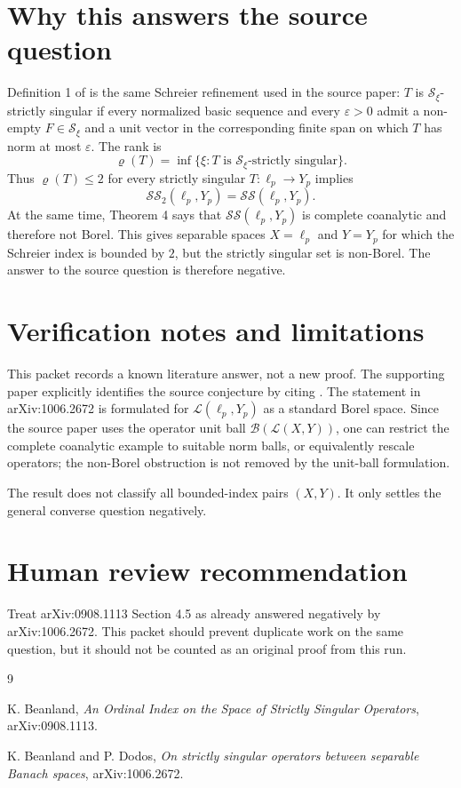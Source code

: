 \documentclass[11pt]{article}
\newcommand{\SSing}{\mathcal{SS}}
\newcommand{\LLop}{\mathcal{L}}
\newcommand{\Sch}{\mathcal{S}}
\newcommand{\Bell}{\mathcal{B}}
\begin{document}
\section*{Why this answers the source question}

Definition 1 of \cite{BeanlandDodos} is the same Schreier refinement used in
the source paper: \(T\) is \(\Sch_\xi\)-strictly singular if every normalized
basic sequence and every \(\varepsilon>0\) admit a non-empty
\(F\in\Sch_\xi\) and a unit vector in the corresponding finite span on which
\(T\) has norm at most \(\varepsilon\).  The rank is
\[
  \varrho(T)=\inf\{\xi:T\text{ is }\Sch_\xi\text{-strictly singular}\}.
\]
Thus \(\varrho(T)\le 2\) for every strictly singular \(T:\ell_p\to Y_p\)
implies
\[
  \SSing_2(\ell_p,Y_p)=\SSing(\ell_p,Y_p).
\]
At the same time, Theorem 4 says that \(\SSing(\ell_p,Y_p)\) is complete
coanalytic and therefore not Borel.  This gives separable spaces \(X=\ell_p\)
and \(Y=Y_p\) for which the Schreier index is bounded by \(2\), but the
strictly singular set is non-Borel.  The answer to the source question is
therefore negative.

\section*{Verification notes and limitations}

This packet records a known literature answer, not a new proof.  The
supporting paper explicitly identifies the source conjecture by citing
\cite[\S 4.5]{Beanland}.  The statement in arXiv:1006.2672 is formulated for
\(\LLop(\ell_p,Y_p)\) as a standard Borel space.  Since the source paper uses
the operator unit ball \(\Bell(\LLop(X,Y))\), one can restrict the complete
coanalytic example to suitable norm balls, or equivalently rescale operators;
the non-Borel obstruction is not removed by the unit-ball formulation.

The result does not classify all bounded-index pairs \((X,Y)\).  It only
settles the general converse question negatively.

\section*{Human review recommendation}

Treat arXiv:0908.1113 Section 4.5 as already answered negatively by
arXiv:1006.2672.  This packet should prevent duplicate work on the same
question, but it should not be counted as an original proof from this run.

\begin{thebibliography}{9}

K. Beanland,
\emph{An Ordinal Index on the Space of Strictly Singular Operators},
arXiv:0908.1113.

K. Beanland and P. Dodos,
\emph{On strictly singular operators between separable Banach spaces},
arXiv:1006.2672.

\end{thebibliography}
\end{document}
